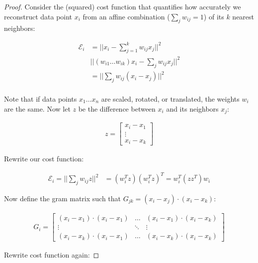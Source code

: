 \documentclass{article}
\begin{document}
        \begin{proof}
            Consider the (squared) cost function that quantifies how accurately we reconstruct data point $x_i$ from an affine combination ($ \sum_j w_{ij} = 1$) of its $k$ nearest neighbors:

            \begin{align*}
                \mathcal{E}_i &= ||x_i - \sum_{j=1}^k w_{ij} x_j||^2 \\
                & || (w_{i1} \ldots w_{ik}) x_i - \sum_j w_{ij} x_j||^2 \\
                &= || \sum_j w_{ij} (x_i - x_j) ||^2 \\
            \end{align*}

            Note that if data points $x_1 \ldots x_n$ are scaled, rotated, or translated, the weights $w_i$ are the same. Now let $z$ be the difference between $x_i$ and its neighbors $x_j$:

            \begin{align*}
                z = \begin{bmatrix} x_i - x_1 \\ \vdots \\ x_i - x_k \end{bmatrix}
            \end{align*}

            Rewrite our cost function:

            \begin{align*}
                \mathcal{E}_i = || \sum_j w_{ij} z ||^2 &= (w_i^T z)(w_i^T z)^T = w_i^T (z z^T) w_i
            \end{align*}

            Now define the gram matrix such that $ G_{jk} = (x_i - x_j) \cdot (x_i - x_k)$:

            \begin{align*}
                G_i = \begin{bmatrix}
                    (x_i - x_1) \cdot (x_i - x_1) & \ldots & (x_i - x_1) \cdot (x_i - x_k) \\
                    \vdots & \ddots & \vdots \\
                    (x_i - x_k) \cdot (x_i - x_1) & \ldots & (x_i - x_k) \cdot (x_i - x_k)
                \end{bmatrix}
            \end{align*}

            Rewrite cost function again:


\end{proof}
\end{document}
